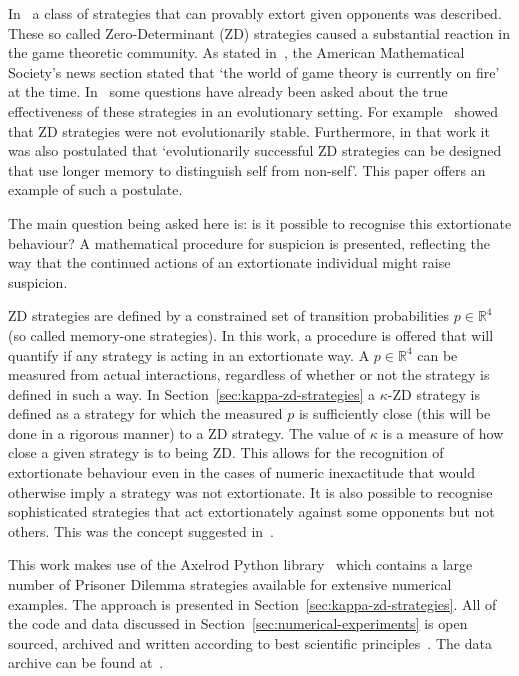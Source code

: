 \documentclass[a4paper]{article}
\begin{document}
In~\cite{Press2012} a class of strategies that can provably extort given
opponents was described. These so called Zero-Determinant (ZD) strategies caused
a substantial reaction in the game theoretic community. As stated
in~\cite{hilbe2015partners}, the American Mathematical Society's news section
stated that `the world of game theory is currently on fire' at the time.
In~\cite{adami2013evolutionary, Hilbe2013, hilbe2013adaptive, hilbe2015partners,
ichinose2018zero, Moran1707} some questions have already been asked about the
true effectiveness of these strategies in an evolutionary setting. For
example~\cite{adami2013evolutionary} showed that ZD strategies were not
evolutionarily stable. Furthermore, in that work it was also postulated that
`evolutionarily successful ZD strategies can be designed that use longer memory
to distinguish self from non-self'. This paper offers an example of such a
postulate.

The main question being asked here is: is it possible to
recognise this extortionate behaviour? A mathematical procedure for suspicion is
presented, reflecting the way that the continued actions of an extortionate
individual might raise suspicion.

ZD strategies are defined by a constrained set of transition probabilities
\(p\in\mathbb{R}^4\) (so called memory-one strategies). In this work, a
procedure is offered that will quantify if any strategy is acting in an
extortionate way. A \(p\in\mathbb{R}^4\) can be measured from actual
interactions, regardless of whether or not the strategy is defined in such a
way. In Section~\ref{sec:kappa-zd-strategies} a \(\kappa\)-ZD strategy is
defined as a strategy for which the measured \(p\) is sufficiently close (this
will be done in a rigorous manner) to a ZD strategy. The value of \(\kappa\) is
a measure of how close a given strategy is to being ZD. This allows for the
recognition of extortionate behaviour even in the cases of numeric inexactitude
that would otherwise imply a strategy was not extortionate. It is also possible
to recognise sophisticated strategies that act extortionately against some
opponents but not others. This was the concept suggested
in~\cite{adami2013evolutionary}.

This work makes use of the Axelrod Python library~\cite{Knight2016, Knight2018}
which contains a large number of Prisoner Dilemma strategies available for
extensive numerical examples.  The approach is presented
in Section~\ref{sec:kappa-zd-strategies}.  All of the code and data discussed
in Section~\ref{sec:numerical-experiments} is open sourced, archived and
written according to best scientific principles~\cite{Wilson2014}. The data
archive can be found at~\cite{vincent_knight_2018_1297075}.
\end{document}
